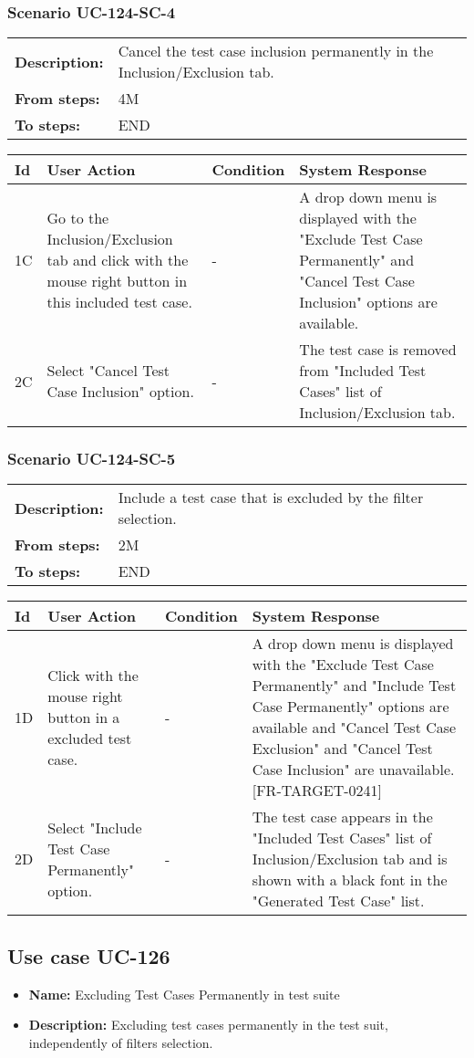 \documentclass[a4paper,11pt]{article}
\newcommand{\bl}{\\ \hline}
\begin{document}
\subsubsection*{Scenario UC-124-SC-4}
\begin{tabular}{p{1in}p{4in}}
{\bf Description:} & Cancel the test case inclusion permanently in the Inclusion/Exclusion tab. \\
{\bf From steps:} & 4M \\
{\bf To steps:} & END \\
\end{tabular}
 
\begin{tabular}{|p{0.8in}|p{1.6in}|p{1.6in}|p{1.6in}|}
\hline
Id & User Action & Condition & System Response  \bl 
1C & Go to the Inclusion/Exclusion tab and click with the mouse right button in this included test case. & - & A drop down menu is displayed with the "Exclude Test Case Permanently" and "Cancel Test Case Inclusion" options are available. \bl 
2C & Select "Cancel Test Case Inclusion" option. & - & The test case is removed from "Included Test Cases" list of Inclusion/Exclusion tab. \bl 
\end{tabular}
\subsubsection*{Scenario UC-124-SC-5}
\begin{tabular}{p{1in}p{4in}}
{\bf Description:} & Include a test case that is excluded by the filter selection. \\
{\bf From steps:} & 2M \\
{\bf To steps:} & END \\
\end{tabular}
 
\begin{tabular}{|p{0.8in}|p{1.6in}|p{1.6in}|p{1.6in}|}
\hline
Id & User Action & Condition & System Response  \bl 
1D & Click with the mouse right button in a excluded test case. & - & A drop down menu is displayed with the "Exclude Test Case Permanently" and "Include Test Case Permanently" options are available and "Cancel Test Case Exclusion" and "Cancel Test Case Inclusion" are unavailable. [FR-TARGET-0241] \bl 
2D & Select "Include Test Case Permanently" option. & - & The test case appears in the "Included Test Cases" list of Inclusion/Exclusion tab and is shown with a black font in the "Generated Test Case" list. \bl 
\end{tabular}
\subsection*{Use case UC-126}
\begin{itemize}
\item {\bf Name: }Excluding Test Cases Permanently in test suite
\item {\bf Description: }Excluding test cases permanently in the test suit, independently of filters selection.
\end{itemize}
\end{document}
